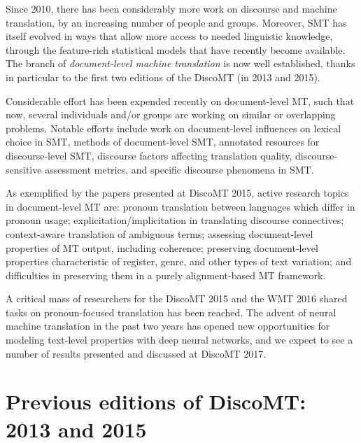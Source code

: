 \documentclass[11pt]{article}
\begin{document}
Since 2010, there has
been considerably more work on discourse and machine translation, by 
an increasing number of people and groups. Moreover, SMT
has itself evolved in ways that allow more access to needed linguistic knowledge,
through the feature-rich statistical models that have recently become available.
The branch of \textit{document-level machine translation} is
now well established, thanks in particular to the first two editions of
the DiscoMT (in 2013 and 2015). 

Considerable effort has been expended recently on document-level MT, such that now, several
individuals and/or groups are working on similar or overlapping problems.
Notable efforts include work on document-level influences on lexical choice in SMT, methods of document-level
SMT, annotated resources for discourse-level SMT, discourse factors affecting translation quality,
discourse-sensitive assessment metrics, and specific discourse phenomena in SMT.

As exemplified by the papers presented at DiscoMT 2015, active research topics in document-level MT are: 
pronoun translation between languages which differ in pronoun usage; 
explicitation/implicitation in translating discourse connectives; 
context-aware translation of ambiguous terms; assessing document-level properties of MT
output, including coherence; preserving document-level
properties characteristic of register, genre, and other types of text variation; and difficulties 
in preserving them in a purely alignment-based MT framework.

A critical mass of researchers for the DiscoMT 2015 and the WMT 2016 shared tasks
on pronoun-focused translation has been reached.  The advent of neural machine 
translation in the past two years has opened new opportunities for modeling 
text-level properties with deep neural networks, and we expect to see a number
of results presented and discussed at DiscoMT 2017.


\section{Previous editions of DiscoMT: 2013 and 2015}
\end{document}
